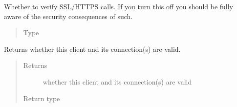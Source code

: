 \documentclass[letterpaper,10pt,english]{sphinxmanual}
\begin{document}
\begin{fulllineitems}
\begin{fulllineitems}
\begin{quote}
\begin{description}
\end{description}\end{quote}

\end{fulllineitems}


\begin{fulllineitems}
\label{\detokenize{autoapi/pine/client/client/index:pine.client.client.BaseClient.verify_ssl}}
\sphinxAtStartPar
Whether to verify SSL/HTTPS calls.  If you turn this off you should be fully aware of the
security consequences of such.
\begin{quote}\begin{description}
\item[{Type}] \leavevmode
\sphinxAtStartPar
{}

\end{description}\end{quote}

\end{fulllineitems}


\begin{fulllineitems}
\label{\detokenize{autoapi/pine/client/client/index:pine.client.client.BaseClient.is_valid}}
\sphinxAtStartPar
Returns whether this client and its connection(s) are valid.
\begin{quote}\begin{description}
\item[{Returns}] \leavevmode
\sphinxAtStartPar
whether this client and its connection(s) are valid

\item[{Return type}] \leavevmode
\sphinxAtStartPar
{}

\end{description}\end{quote}


\end{fulllineitems}
\end{fulllineitems}
\end{document}
